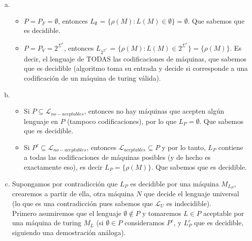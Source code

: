 \documentclass[dcc]{fcfmcourse}
\begin{document}
\begin{problems}
 \problem 
 \begin{enumerate}[a)]
     \item 
     \begin{itemize}
         \item $P = P_{F} = \emptyset$, entonces $L_{\emptyset}$ = $\{\rho (M)\colon L(M) \in \emptyset\} = \emptyset$. Que sabemos que es decidible.
         \item $P = P_{V} = 2^{\Sigma^*}$, entonces $L_{2^{\Sigma^*}}$ = $\{\rho (M)\colon L(M) \in 2^{\Sigma^*}\} = \{\rho (M)\}$. Es decir, el lenguaje de TODAS las codificaciones de máquinas, que sabemos que es decidible (algoritmo toma su entrada y decide si corresponde a una codificación de un máquina de turing válida).
     \end{itemize}
     \item 
     \begin{itemize}
         \item Si $P\subseteq \mathcal{L}_{no-aceptables}$, entonces no hay máquinas que acepten algún lenguaje en $P$ (tampoco codificaciones), por lo que $L_{P} = \emptyset$. Que sabemos que es decidible.
         \item Si $P^c\subseteq \mathcal{L}_{no-aceptables}$, entonces $\mathcal{L}_{aceptables} \subseteq P$ y por lo tanto, $L_{P}$ contiene a todas las codificaciones de máquinas posibles (y de hecho es exactamente eso), es decir $L_{P} = \{\rho(M)\}$. Que sabemos que es decidible.
     \end{itemize}
     
     \item Supongamos por contradicción que $L_{P}$ es decidible por una máquina $M_{L_{P}}$, crearemos a partir de ella, otra máquina $N$ que decide el lenguaje universal (lo que es una contradicción pues sabemos que $\mathcal{L}_{U}$ es indecidible).\\
     
     Primero asumiremos que el lenguaje $\emptyset\not\in P$ y tomaremos $L\in P$ aceptable por una máquina de turing $M_{L}$ (si $\emptyset\in P$ consideramos $P^c$, y $L_{P}^c$ que es decidible, siguiendo una demostración análoga).\\
     

\end{enumerate}
\end{problems}
\end{document}
